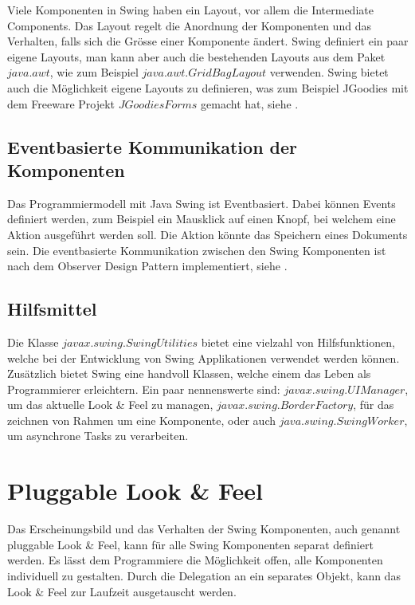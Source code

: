   Viele Komponenten in Swing haben ein Layout, vor allem die Intermediate
  Components. Das Layout regelt die Anordnung der Komponenten und das Verhalten,
  falls sich die Grösse einer Komponente ändert. Swing definiert ein paar eigene
  Layouts, man kann aber auch die bestehenden Layouts aus dem Paket
  \(java.awt\), wie zum Beispiel \(java.awt.GridBagLayout\) verwenden. Swing
  bietet auch die Möglichkeit eigene Layouts zu definieren, was zum Beispiel
  JGoodies mit dem Freeware Projekt \(JGoodies Forms\) gemacht hat, siehe
  \cite{JGoodiesForms}.
    
  \subsection{Eventbasierte Kommunikation der Komponenten}
  
  Das Programmiermodell mit Java Swing ist Eventbasiert. Dabei können Events
  definiert werden, zum Beispiel ein Mausklick auf einen Knopf, bei welchem
  eine Aktion ausgeführt werden soll. Die Aktion könnte das Speichern eines
  Dokuments sein. Die eventbasierte Kommunikation zwischen den Swing
  Komponenten ist nach dem Observer Design Pattern implementiert, siehe
  \cite{ObserverDesignPattern}.
  
  \subsection{Hilfsmittel}
  
  Die Klasse \(javax.swing.SwingUtilities\) bietet eine vielzahl von
  Hilfsfunktionen, welche bei der Entwicklung von Swing Applikationen verwendet
  werden können. Zusätzlich bietet Swing eine handvoll Klassen, welche einem
  das Leben als Programmierer erleichtern. Ein paar nennenswerte sind:
  \(javax.swing.UIManager\), um das aktuelle Look \& Feel zu managen,
  \(javax.swing.BorderFactory\), für das zeichnen von Rahmen um eine
  Komponente, oder auch \(java.swing.SwingWorker\), um asynchrone Tasks
  zu verarbeiten.
  
  \section{Pluggable Look \& Feel}
  
  Das Erscheinungsbild und das Verhalten der Swing Komponenten, auch genannt
  pluggable Look \& Feel, kann für alle Swing Komponenten separat definiert
  werden. Es lässt dem Programmiere die Möglichkeit offen, alle Komponenten
  individuell zu gestalten. Durch die Delegation an ein separates Objekt, kann
  das Look \& Feel zur Laufzeit ausgetauscht werden.
  
